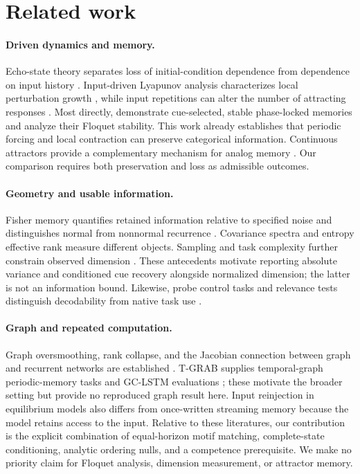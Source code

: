 \section{Related work}
\label{sec:related}

\paragraph{Driven dynamics and memory.}
Echo-state theory separates loss of initial-condition dependence from dependence on input history \citep{jaeger2001,manjunath2013}. Input-driven Lyapunov analysis characterizes local perturbation growth \citep{vogt2020}, while input repetitions can alter the number of attracting responses \citep{ashwin2023-echo-repetitions}. Most directly, \citet{pals2024-phase-locked-memory} demonstrate cue-selected, stable phase-locked memories and analyze their Floquet stability. This work already establishes that periodic forcing and local contraction can preserve categorical information. Continuous attractors provide a complementary mechanism for analog memory \citep{seung1996}. Our comparison requires both preservation and loss as admissible outcomes.

\paragraph{Geometry and usable information.}
Fisher memory quantifies retained information relative to specified noise and distinguishes normal from nonnormal recurrence \citep{ganguli2008-memory-traces}. Covariance spectra \citep{hu2022} and entropy effective rank \citep{roy2007effective} measure different objects. Sampling and task complexity further constrain observed dimension \citep{gao2017dimensionality}. These antecedents motivate reporting absolute variance and conditioned cue recovery alongside normalized dimension; the latter is not an information bound. Likewise, probe control tasks and relevance tests distinguish decodability from native task use \citep{hewitt2019-control-probes,ravichander2021-probe-relevance}.

\paragraph{Graph and repeated computation.}
Graph oversmoothing, rank collapse, and the Jacobian connection between graph and recurrent networks are established \citep{oono2020exponential,roth2024rank,arroyo2025bridging}. T-GRAB supplies temporal-graph periodic-memory tasks and GC-LSTM evaluations \citep{dizaji2025tgrab}; these motivate the broader setting but provide no reproduced graph result here. Input reinjection in equilibrium models \citep{deep_equilibrium} also differs from once-written streaming memory because the model retains access to the input. Relative to these literatures, our contribution is the explicit combination of equal-horizon motif matching, complete-state conditioning, analytic ordering nulls, and a competence prerequisite. We make no priority claim for Floquet analysis, dimension measurement, or attractor memory.
